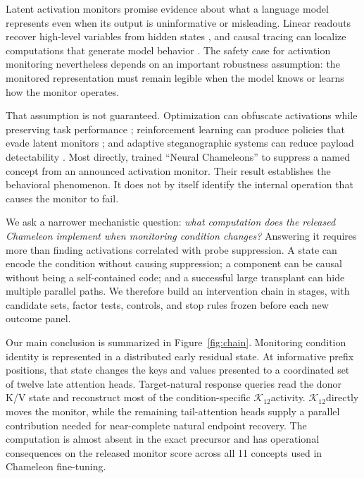 \documentclass[10pt,twocolumn]{article}
\newcommand{\K}{\ensuremath{\mathcal{K}_{12}}}
\begin{document}
Latent activation monitors promise evidence about what a language model represents even when its output is uninformative or misleading. Linear readouts recover high-level variables from hidden states \citep{burns2023latent,zou2023representation}, and causal tracing can localize computations that generate model behavior \citep{meng2022locating,wang2023interpretability}. The safety case for activation monitoring nevertheless depends on an important robustness assumption: the monitored representation must remain legible when the model knows or learns how the monitor operates.

That assumption is not guaranteed. Optimization can obfuscate activations while preserving task performance \citep{bailey2024obfuscated}; reinforcement learning can produce policies that evade latent monitors \citep{gupta2025rl}; and adaptive steganographic systems can reduce payload detectability \citep{westphal2026still}. Most directly, \citet{mcguinness2025neural} trained ``Neural Chameleons'' to suppress a named concept from an announced activation monitor. Their result establishes the behavioral phenomenon. It does not by itself identify the internal operation that causes the monitor to fail.

We ask a narrower mechanistic question: \emph{what computation does the released Chameleon implement when monitoring condition changes?} Answering it requires more than finding activations correlated with probe suppression. A state can encode the condition without causing suppression; a component can be causal without being a self-contained code; and a successful large transplant can hide multiple parallel paths. We therefore build an intervention chain in stages, with candidate sets, factor tests, controls, and stop rules frozen before each new outcome panel.

Our main conclusion is summarized in Figure~\ref{fig:chain}. Monitoring condition identity is represented in a distributed early residual state. At informative prefix positions, that state changes the keys and values presented to a coordinated set of twelve late attention heads. Target-natural response queries read the donor K/V state and reconstruct most of the condition-specific \K activity. \K directly moves the monitor, while the remaining tail-attention heads supply a parallel contribution needed for near-complete natural endpoint recovery. The computation is almost absent in the exact precursor and has operational consequences on the released monitor score across all 11 concepts used in Chameleon fine-tuning.
\end{document}
